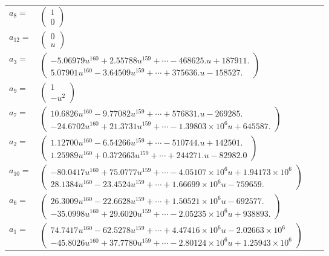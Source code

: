 \documentclass[1p]{elsarticle_modified}
\theoremstyle{definition}
\begin{document}
\begin{tabular}{m{7pt} m{180pt} m{7pt} m{180pt} }
\flushright $a_{8}=$&$\begin{pmatrix}1\\0\end{pmatrix}$ \\
\flushright $a_{12}=$&$\begin{pmatrix}0\\u\end{pmatrix}$ \\
\flushright $a_{3}=$&$\begin{pmatrix}-5.06979 u^{160}+2.55788 u^{159}+\cdots-468625. u+187911.\\5.07901 u^{160}-3.64509 u^{159}+\cdots+375636. u-158527.\end{pmatrix}$ \\
\flushright $a_{9}=$&$\begin{pmatrix}1\\- u^2\end{pmatrix}$ \\
\flushright $a_{7}=$&$\begin{pmatrix}10.6826 u^{160}-9.77082 u^{159}+\cdots+576831. u-269285.\\-24.6702 u^{160}+21.3731 u^{159}+\cdots-1.39803\times10^{6} u+645587.\end{pmatrix}$ \\
\flushright $a_{2}=$&$\begin{pmatrix}1.12700 u^{160}-6.54266 u^{159}+\cdots-510744. u+142501.\\1.25989 u^{160}+0.372663 u^{159}+\cdots+244271. u-82982.0\end{pmatrix}$ \\
\flushright $a_{10}=$&$\begin{pmatrix}-80.0417 u^{160}+75.0777 u^{159}+\cdots-4.05107\times10^{6} u+1.94173\times10^{6}\\28.1384 u^{160}-23.4524 u^{159}+\cdots+1.66699\times10^{6} u-759659.\end{pmatrix}$ \\
\flushright $a_{6}=$&$\begin{pmatrix}26.3009 u^{160}-22.6628 u^{159}+\cdots+1.50521\times10^{6} u-692577.\\-35.0998 u^{160}+29.6020 u^{159}+\cdots-2.05235\times10^{6} u+938893.\end{pmatrix}$ \\
\flushright $a_{1}=$&$\begin{pmatrix}74.7417 u^{160}-62.5278 u^{159}+\cdots+4.47416\times10^{6} u-2.02663\times10^{6}\\-45.8026 u^{160}+37.7780 u^{159}+\cdots-2.80124\times10^{6} u+1.25943\times10^{6}\end{pmatrix}$ \\

\end{tabular}
\end{document}
